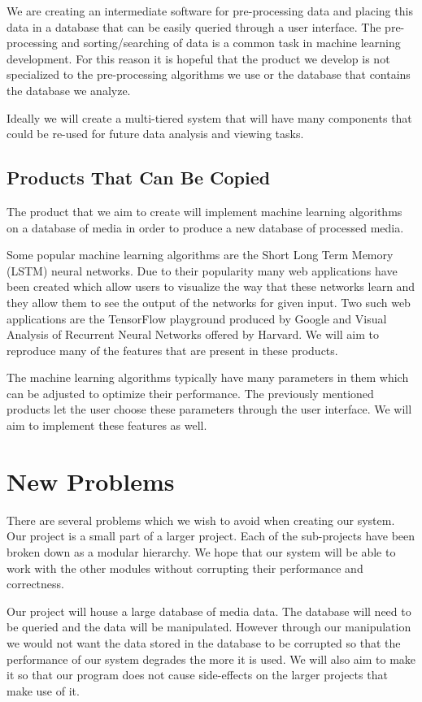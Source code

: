 \documentclass{scrreprt}
\begin{document}
{We are creating an intermediate software for pre-processing data and
placing this data in a database that can be easily queried through a
user interface. The pre-processing and sorting/searching of data is a
common task in machine learning development. For this reason it is
hopeful that the product we develop is not specialized to the
pre-processing algorithms we use or the database that contains the
database we analyze.}

{Ideally we will create a multi-tiered system that will have many
components that could be re-used for future data analysis and viewing
tasks.}

\subsection{Products That Can Be Copied}

{The product that we aim to create will implement machine learning
algorithms on a database of media in order to produce a new database of
processed media.}

{Some popular machine learning algorithms are the Short Long Term Memory
(LSTM) neural networks. Due to their popularity many web applications
have been created which allow users to visualize the way that these
networks learn and they allow them to see the output of the networks for
given input. Two such web applications are the TensorFlow playground
produced by Google and Visual Analysis of Recurrent Neural Networks
offered by Harvard. We will aim to reproduce many of the features that
are present in these products.}

{The machine learning algorithms typically have many parameters in them
which can be adjusted to optimize their performance. The previously
mentioned products let the user choose these parameters through the user
interface. We will aim to implement these features as well.}

\section{New Problems}

{There are several problems which we wish to avoid when creating our
system. Our project is a small part of a larger project. Each of the
sub-projects have been broken down as a modular hierarchy. We hope that
our system will be able to work with the other modules without
corrupting their performance and correctness.}

{Our project will house a large database of media data. The database
will need to be queried and the data will be manipulated. However through our
manipulation we would not want the data stored in the database to be
corrupted so that the performance of our system degrades the more it is
used. We will also aim to make it so that our program does not cause
side-effects on the larger projects that make use of it.}
\end{document}
